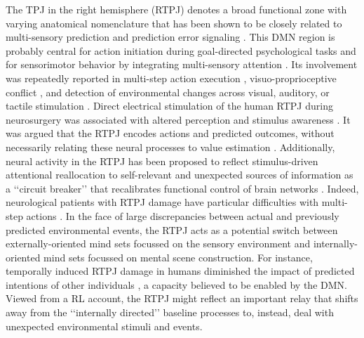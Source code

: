 \documentclass[10pt,letterpaper]{article}
\begin{document}
The TPJ in the right hemisphere (RTPJ) denotes a broad functional zone with
varying anatomical nomenclature \citep{marstpj2011, seghier2010, seghier2013angular}
that has been shown to be closely related to
multi-sensory prediction and prediction error signaling
\citep{downar2000multimodal, vetter2011, shulman2010, shulman2007}.
This DMN region is probably central for
action initiation during goal-directed psychological tasks and for
sensorimotor behavior by integrating multi-sensory attention
\citep{corbetta2002control}.
Its involvement was repeatedly reported in
multi-step action execution \citep{hartmann2005takes},
visuo-proprioceptive conflict \citep{Balslev2005}, and
detection of environmental changes across
visual, auditory, or tactile stimulation
\citep{downar2000multimodal}.
Direct electrical stimulation of the human
RTPJ during neurosurgery was associated with altered perception
and stimulus awareness \citep{blanke2002neuropsychology}.
%
It was argued that the RTPJ encodes actions and predicted outcomes,
without necessarily relating these neural processes to value estimation
\citep{liljeholm2013neural, hamilton2008action,
jakobs2009effects}.
Additionally, neural activity in the RTPJ has been proposed to reflect
stimulus-driven attentional reallocation to
self-relevant and unexpected sources of information
as a ‘‘circuit breaker’’ that recalibrates functional control of brain networks
\citep{bzdok2013tpj, corbettashul2008}.
Indeed, neurological patients with RTPJ damage have particular difficulties
with multi-step actions \citep{hartmann2005takes}.
In the face of large discrepancies between actual and previously predicted
environmental events, the RTPJ acts as a potential switch between
externally-oriented mind sets focussed on the
sensory environment and internally-oriented mind sets focussed
on mental scene construction.
For instance, temporally induced RTPJ damage in humans diminished the
impact of predicted intentions of other individuals
\citep{young2010disruption},
a capacity believed to be enabled by the DMN.
Viewed from a RL account,
the RTPJ might reflect an important relay that shifts away
from the ‘‘internally directed’’ baseline processes
to, instead, deal with unexpected environmental stimuli and events.
\end{document}
